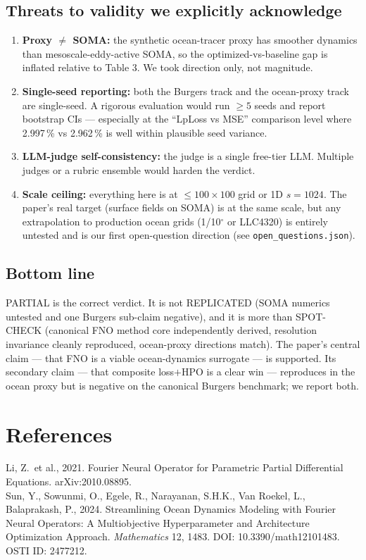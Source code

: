 \documentclass[11pt]{article}
\begin{document}
\subsection*{Threats to validity we explicitly acknowledge}
\begin{enumerate}
  \item \textbf{Proxy $\ne$ SOMA:} the synthetic ocean-tracer proxy has smoother dynamics
        than mesoscale-eddy-active SOMA, so the optimized-vs-baseline gap is inflated relative
        to Table 3. We took direction only, not magnitude.
  \item \textbf{Single-seed reporting:} both the Burgers track and the ocean-proxy track are
        single-seed. A rigorous evaluation would run $\geq 5$ seeds and report bootstrap CIs
        --- especially at the ``LpLoss vs MSE'' comparison level where 2.997\,\% vs 2.962\,\%
        is well within plausible seed variance.
  \item \textbf{LLM-judge self-consistency:} the judge is a single free-tier LLM. Multiple
        judges or a rubric ensemble would harden the verdict.
  \item \textbf{Scale ceiling:} everything here is at $\leq 100\times100$ grid or 1D
        $s=1024$. The paper's real target (surface fields on SOMA) is at the same scale, but
        any extrapolation to production ocean grids (1/10$^\circ$ or LLC4320) is entirely
        untested and is our first open-question direction (see \texttt{open\_questions.json}).
\end{enumerate}

\subsection*{Bottom line}
PARTIAL is the correct verdict. It is not REPLICATED (SOMA numerics untested and one
Burgers sub-claim negative), and it is more than SPOT-CHECK (canonical FNO method core
independently derived, resolution invariance cleanly reproduced, ocean-proxy directions
match). The paper's central claim --- that FNO is a viable ocean-dynamics surrogate --- is
supported. Its secondary claim --- that composite loss$+$HPO is a clear win --- reproduces in
the ocean proxy but is negative on the canonical Burgers benchmark; we report both.

\section{References}
Li, Z.\ et al., 2021. Fourier Neural Operator for Parametric Partial Differential
Equations. arXiv:2010.08895.\\
Sun, Y., Sowunmi, O., Egele, R., Narayanan, S.H.K., Van Roekel, L., Balaprakash, P., 2024.
Streamlining Ocean Dynamics Modeling with Fourier Neural Operators: A Multiobjective
Hyperparameter and Architecture Optimization Approach. \emph{Mathematics} 12, 1483.
DOI: 10.3390/math12101483. OSTI ID: 2477212.
\end{document}
